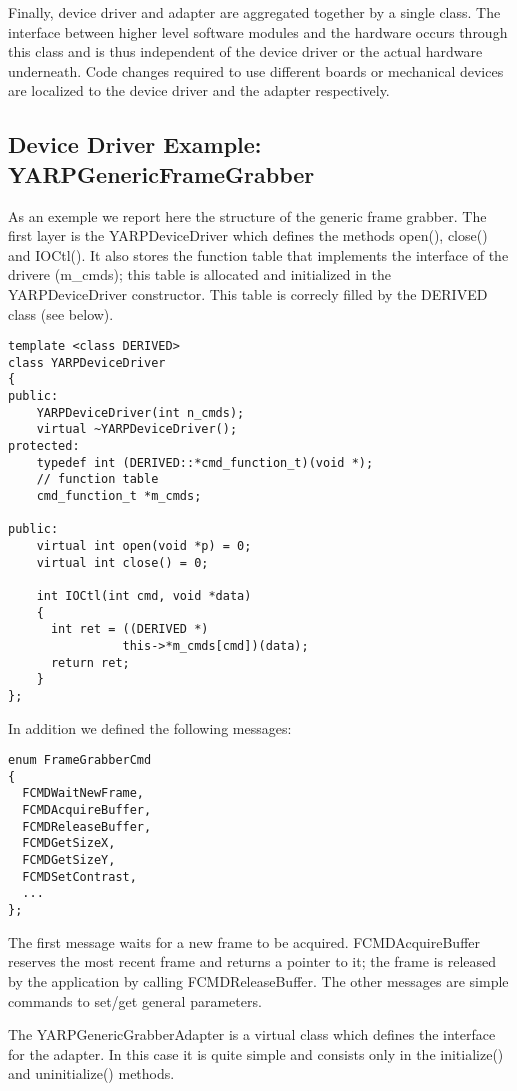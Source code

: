 Finally, device driver and adapter are aggregated together by a single class. The interface between higher level software modules and the hardware occurs through this class and is thus independent of the device driver or the actual hardware underneath. Code changes required to use different boards or mechanical devices are localized to the device driver and the adapter respectively.

\subsection{Device Driver Example: YARPGenericFrameGrabber}
As an exemple we report here the structure of the generic frame grabber. The first layer is the YARPDeviceDriver which defines the methods open(), close() and IOCtl(). It also stores the function table that implements the interface of the drivere (m\_cmds); this table is allocated and initialized in the YARPDeviceDriver constructor. This table is correcly filled by the DERIVED class (see below).

{\small \begin{verbatim}
template <class DERIVED>
class YARPDeviceDriver
{
public:
	YARPDeviceDriver(int n_cmds);
	virtual ~YARPDeviceDriver();
protected:
	typedef int (DERIVED::*cmd_function_t)(void *);
	// function table
	cmd_function_t *m_cmds;

public:
	virtual int open(void *p) = 0;
	virtual int close() = 0;

	int IOCtl(int cmd, void *data)
	{
	  int ret = ((DERIVED *)
	            this->*m_cmds[cmd])(data);
	  return ret;
	}
};
\end{verbatim} }

In addition we defined the following messages:

{\small \begin{verbatim}
enum FrameGrabberCmd
{
  FCMDWaitNewFrame,
  FCMDAcquireBuffer,
  FCMDReleaseBuffer,
  FCMDGetSizeX,
  FCMDGetSizeY,
  FCMDSetContrast,
  ...
};
\end{verbatim} }

The first message waits for a new frame to be acquired. FCMDAcquireBuffer reserves the most recent frame and returns a pointer to it; the frame is released by the application by calling FCMDReleaseBuffer. The other messages are simple commands to set/get general parameters.

The YARPGenericGrabberAdapter is a virtual class which defines the interface for the adapter. In this case it is quite simple and consists only in the initialize() and uninitialize() methods. 

